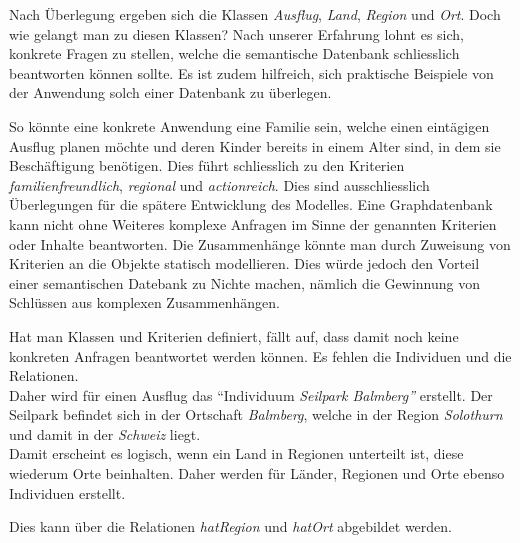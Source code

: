 Nach Überlegung ergeben sich die Klassen \textit{Ausflug}, \textit{Land}, \textit{Region} und \textit{Ort}. Doch wie gelangt man zu diesen Klassen? Nach unserer Erfahrung lohnt es sich, konkrete Fragen zu stellen, welche die semantische Datenbank schliesslich beantworten können sollte. Es ist zudem hilfreich, sich praktische Beispiele von der Anwendung solch einer Datenbank zu überlegen.

So könnte eine konkrete Anwendung eine Familie sein, welche einen eintägigen Ausflug planen möchte und deren Kinder bereits in einem Alter sind, in dem sie Beschäftigung benötigen. Dies führt schliesslich zu den Kriterien \textit{familienfreundlich}, \textit{regional} und \textit{actionreich}. Dies sind ausschliesslich Überlegungen für die spätere Entwicklung des Modelles. Eine Graphdatenbank kann nicht ohne Weiteres komplexe Anfragen im Sinne der genannten Kriterien oder Inhalte beantworten. Die Zusammenhänge könnte man durch Zuweisung von Kriterien an die Objekte statisch modellieren. Dies würde jedoch den Vorteil einer semantischen Datebank zu Nichte machen, nämlich die Gewinnung von Schlüssen aus komplexen Zusammenhängen.

Hat man Klassen und Kriterien definiert, fällt auf, dass damit noch keine konkreten Anfragen beantwortet werden können. Es fehlen die Individuen und die Relationen.\\
Daher wird für einen Ausflug das ``Individuum \textit{Seilpark Balmberg''} erstellt. Der Seilpark befindet sich in der Ortschaft \textit{Balmberg}, welche in der Region \textit{Solothurn} und damit in der \textit{Schweiz} liegt.\\
Damit erscheint es logisch, wenn ein Land in Regionen unterteilt ist, diese wiederum Orte beinhalten. Daher werden für Länder, Regionen und Orte ebenso Individuen erstellt.

Dies kann über die Relationen \textit{hatRegion} und \textit{hatOrt} abgebildet werden.

